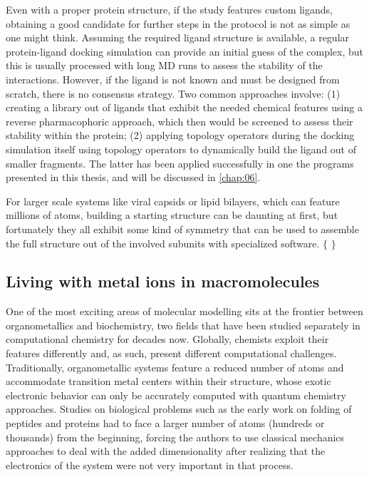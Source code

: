 Even with a proper protein structure, if the study features custom ligands, obtaining a good candidate for further steps in the protocol is not as simple as one might think. Assuming the required ligand structure is available, a regular protein-ligand docking simulation can provide an initial guess of the complex, but this is usually processed with long MD runs to assess the stability of the interactions. However, if the ligand is not known and must be designed from scratch, there is no consensus strategy. Two common approaches involve: (1) creating a library out of ligands that exhibit the needed chemical features using a reverse pharmacophoric approach, which then would be screened to assess their stability within the protein; (2) applying topology operators during the docking simulation itself using topology operators to dynamically build the ligand out of smaller fragments. The latter has been applied successfully in one the programs presented in this thesis, and will be discussed in \autoref{chap:06}.

For larger scale systems like viral capsids or lipid bilayers, which can feature millions of atoms, building a starting structure can be daunting at first, but fortunately they all exhibit some kind of symmetry that can be used to assemble the full structure out of the involved subunits with specialized software. $ \{ $ $ \} $

\subsection{Living with metal ions in macromolecules}
One of the most exciting areas of molecular modelling sits at the frontier between organometallics and biochemistry, two fields that have been studied separately in computational chemistry for decades now. Globally, chemists exploit their features differently and, as such, present different computational challenges. Traditionally, organometallic systems feature a reduced number of atoms and accommodate transition metal centers within their structure, whose exotic electronic behavior can only be accurately computed with quantum chemistry approaches. Studies on biological problems such as the early work on folding of peptides and proteins had to face a larger number of atoms (hundreds or thousands) from the beginning, forcing the authors to use classical mechanics approaches to deal with the added dimensionality after realizing that the electronics of the system were not very important in that process.


